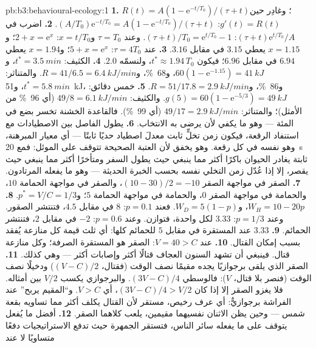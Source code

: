 \begin{solution}{pb:b3:behavioural-ecology:1}
\textbf{1.} $R(t) = A(1 - \mathrm{e}^{-t/T_{0}})/(\tau + t)$؛ وغادِر حين
$g'(t) = R(t)$: $(A/T_{0})\mathrm{e}^{-t/T_{0}} = A(1 - \mathrm{e}^{-t/T_{0}})/
(\tau + t)$.
\textbf{2.} اضرب في $(\tau + t)\mathrm{e}^{t/T_{0}}/A$: $(\tau + t)/T_{0}
= \mathrm{e}^{t/T_{0}} - 1$. وعند $\tau = T_{0}$ و$x = t/T_{0}$: $2 + x =
\mathrm{e}^{x}$؛ و$x = 1.15$ يعطي $3.15$ في مقابل $3.16$.
\textbf{3.} عند $\tau = 4T_{0}$: $5 + x = \mathrm{e}^{x}$؛ و$x = 1.94$ يعطي
$6.94$ في مقابل $6.96$؛ فيكون $t^{*} \approx 1.94\,T_{0}$، ولنسمّه $2.0$.
\textbf{4.} الكثيف: $t^{*} = \qty{3.5}{min}$، و$60(1 - \mathrm{e}^{-1.15}) =
\qty{41}{kJ}$، و\qty{68}{\%}، و$R = 41/6.5 = \qty{6.4}{kJ/min}$. والمتناثر:
$t^{*} = \qty{5.8}{min}$، و\qty{51}{kJ}، و\qty{86}{\%}، و$R = 51/17.8 =
\qty{2.9}{kJ/min}$.
\textbf{5.} خمس دقائق: $g(5) = 60(1 - \mathrm{e}^{-5/3}) = \qty{49}{kJ}$.
والكثيف: $49/8 = \qty{6.1}{kJ/min}$ (أي \qty{96}{\%} من الأمثل)؛ والمتناثر:
$49/17 = \qty{2.9}{kJ/min}$ (أي \qty{99}{\%}). فالقاعدة الخشنة تخسر بضع في
المئة --- وهو ما يكفي لأن يرضى به الانتخاب.
\textbf{6.} يطول الفاصل بين الاصطيادات مع استنفاد
الرقعة، فيكون زمن تخلٍّ ثابت معدلَ اصطياد حديًا ثابتًا
--- أي معيار المبرهنة، وهو نفسه في كل رقعة. وهو يخفق
لأن العتبة الصحيحة تتوقف على الموئل: فمع \qty{20}{s} ثابتة
يغادر الحيوان باكرًا أكثر مما ينبغي حيث يطول السفر ومتأخرًا
أكثر مما ينبغي حيث يقصر، إلا إذا عُدّل زمن التخلي نفسه
بحسب الخبرة الحديثة --- وهو ما يفعله المرتادون.
\textbf{7.} الصقر في مواجهة الصقر $(10 - 30)/2 = -10$، والصقر في مواجهة الحمامة $10$، والحمامة في مواجهة
الصقر $0$، والحمامة في مواجهة الحمامة $5$؛ و$p^{*} = V/C = 1/3$.
\textbf{8.} $W_{H} = 10 - 20p$، و$W_{D} = 5(1 - p)$. فعند $p = 0.1$: $8$ في مقابل
$4.5$، فتنتشر الصقور. وعند $p = 1/3$: $3.33$ لكل واحدة، فتوازن. وعند $p = 0.6$: $-2$
في مقابل $2$، فتنتشر الحمائم.
\textbf{9.} $3.33$ عند المستقرة في مقابل $5$ للحمائم كلها: أي ثلث
قيمة كل منازعة يُفقد بسبب إمكان القتال.
\textbf{10.} عند $V = 40 > C$: الصقر هو المستقرة الصرفة؛ وكل منازعة قتال.
فينبغي أن تشهد السنون العجاف قتالًا أكثر وإصابات أكثر --- وهي كذلك.
\textbf{11.} الصقر الذي يلقى برجوازيًا يجده مقيمًا نصف الوقت
(فقتال، $(V - C)/2$) ودخيلًا نصف الوقت (فنصر بلا قتال، $V$):
فالوسطي $(3V - C)/4$. والبرجوازي يكسب $V/2$ بين أمثاله. فلا يغزو الصقر
إلا إذا كان $(3V - C)/4 > V/2$، أي $V > C$. و``المقيم يربح'' عند
الفراشة برجوازيٌّ: أي عرف رخيص، مستقر لأن القتال يكلف
أكثر مما تساويه بقعة شمس --- وحين يظن الاثنان نفسيهما
مقيمين، يلعب كلاهما الصقر.
\textbf{12.} أفضل ما يُفعل يتوقف على ما يفعله سائر الناس،
فتستقر الجمهرة حيث تدفع الاستراتيجيات دفعًا متساويًا لا عند

\end{solution}
